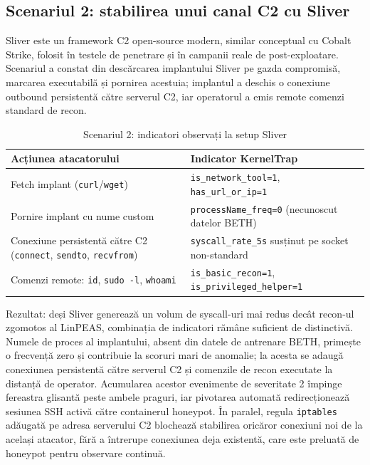 \subsection{Scenariul 2: stabilirea unui canal C2 cu Sliver}

Sliver este un framework C2 open-source modern, similar conceptual cu
Cobalt Strike, folosit în testele de penetrare și în campanii reale de
post-exploatare. Scenariul a constat din descărcarea implantului Sliver
pe gazda compromisă, marcarea executabilă și pornirea acestuia; implantul
a deschis o conexiune outbound persistentă către serverul C2, iar
operatorul a emis remote comenzi standard de recon.

\begin{table}[h]
  \centering
  \caption{Scenariul 2: indicatori observați la setup Sliver}
  \label{tab:cap6-scen2}
  \renewcommand{\arraystretch}{1.08}
  \begin{tabular}{|p{}|p{}|}
    \hline
    \textbf{Acțiunea atacatorului} & \textbf{Indicator KernelTrap} \\
    \hline\hline
    Fetch implant (\texttt{curl}/\texttt{wget})              & \texttt{is\_network\_tool=1}, \texttt{has\_url\_or\_ip=1} \\
    \hline
    Pornire implant cu nume custom                          & \texttt{processName\_freq=0} (necunoscut datelor BETH) \\
    \hline
    Conexiune persistentă către C2 (\texttt{connect}, \texttt{sendto}, \texttt{recvfrom})  & \texttt{syscall\_rate\_5s} susținut pe socket non-standard \\
    \hline
    Comenzi remote: \texttt{id}, \texttt{sudo -l}, \texttt{whoami}  & \texttt{is\_basic\_recon=1}, \texttt{is\_privileged\_helper=1} \\
    \hline
  \end{tabular}
\end{table}

Rezultat: deși Sliver generează un volum de syscall-uri mai redus decât recon-ul
zgomotos al LinPEAS, combinația de indicatori rămâne suficient de distinctivă.
Numele de proces al implantului, absent din datele de antrenare BETH, primește o
frecvență zero și contribuie la scoruri mari de anomalie; la acesta se adaugă
conexiunea persistentă către serverul C2 și comenzile de recon executate la
distanță de operator. Acumularea acestor evenimente de severitate 2 împinge
fereastra glisantă peste ambele praguri, iar pivotarea automată redirecționează
sesiunea SSH activă către containerul honeypot. În paralel, regula
\texttt{iptables} adăugată pe adresa serverului C2 blochează stabilirea oricăror
conexiuni noi de la același atacator, fără a întrerupe conexiunea deja existentă,
care este preluată de honeypot pentru observare continuă.

